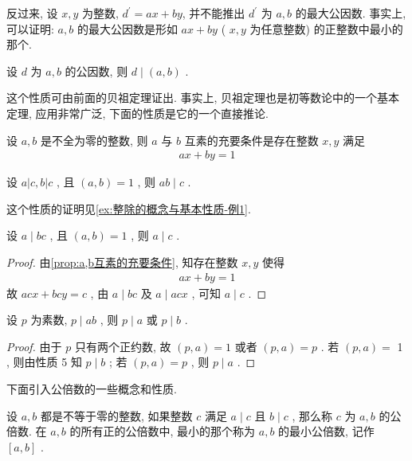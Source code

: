 \begin{note}
	反过来, 设 $x ,  y$ 为整数, $d^{\prime}=a x+b y$, 并不能推出 $d^{\prime}$ 为 $a ,  b$ 的最大公因数. 事实上, 可以证明: $a ,  b$ 的最大公因数是形如 $a x+b y$ ( $x, y$ 为任意整数) 的正整数中最小的那个.
\end{note}

\begin{property}\label{prop:如果d是a,b公因数则d|(a,b)}
	设 $d$ 为 $a ,  b$ 的公因数, 则 $d \mid(a, b)$ .
\end{property}

这个性质可由前面的贝祖定理证出. 事实上, 贝祖定理也是初等数论中的一个基本定理, 应用非常广泛, 下面的性质是它的一个直接推论.

\begin{property}\label{prop:a,b互素的充要条件}
	设 $a ,  b$ 是不全为零的整数, 则 $a$ 与 $b$ 互素的充要条件是存在整数 $x ,  y$ 满足
	\begin{align*}
		a x+b y=1
	\end{align*}
\end{property}

\begin{property}
	设 $a|c, b| c$ , 且 $(a, b)=1$ , 则 $a b \mid c$ .
\end{property}
这个性质的证明见\autoref{ex:整除的概念与基本性质-例1}.

\begin{property}
	设 $a \mid b c$ , 且 $(a, b)=1$ , 则 $a \mid c$ .
\end{property}
\begin{proof}
	由\autoref{prop:a,b互素的充要条件}, 知存在整数 $x, y$ 使得
	\begin{align*}
		a x+b y=1
	\end{align*}
	故 $a c x+b c y=c$ , 由 $a \mid b c$ 及 $a \mid a c x$ , 可知 $a \mid c$ .
\end{proof}

\begin{property}\label{prop:如果p是ab的公因数则p是a或b的公因数}
	设 $p$ 为素数,  $p \mid a b$ , 则 $p \mid a$ 或 $p \mid b$ .
\end{property}
\begin{proof}
	由于 $p$ 只有两个正约数, 故 $(p, a)=1$ 或者 $(p, a)=p$ . 若 $(p, a)=$ 1 , 则由性质 5 知 $p \mid b$ ; 若 $(p, a)=p$ , 则 $p \mid a$ .
\end{proof}

下面引入公倍数的一些概念和性质.

设 $a ,  b$ 都是不等于零的整数, 如果整数 $c$ 满足 $a \mid c$ 且 $b \mid c$ , 那么称 $c$ 为 $a ,  b$ 的公倍数. 在 $a ,  b$ 的所有正的公倍数中, 最小的那个称为 $a ,  b$ 的最小公倍数, 记作 $[a, b]$ .

